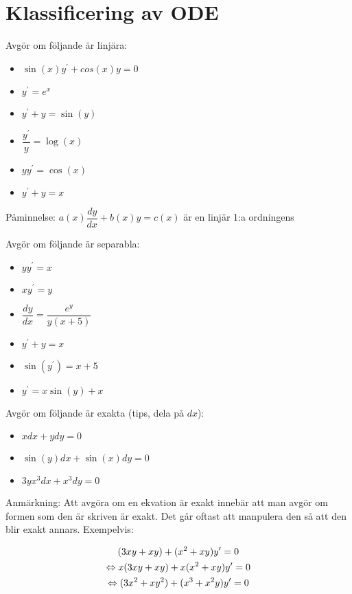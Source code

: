\section{Klassificering av ODE}

\noindent Avgör om följande är linjära:

\begin{itemize}
  \item $\sin(x)y^{\prime}+cos(x)y=0$
  \item $y^{\prime}=e^x$
  \item $y^{\prime}+y=\sin(y)$
  \item $\dfrac{y^{\prime}}{y}=\log(x)$
  \item $yy^{\prime}=\cos(x)$
  \item $y^{\prime}+y=x$
\end{itemize}

\noindent Påminnelse: $a(x)\dfrac{dy}{dx}+b(x)y=c(x)$ är en linjär 1:a ordningens
\par\bigskip

\noindent Avgör om följande är separabla:

\begin{itemize}
  \item $yy^{\prime}=x$
  \item $xy^{\prime}=y$
  \item $\dfrac{dy}{dx}=\dfrac{e^y}{y(x+5)}$
  \item $y^{\prime}+y=x$
  \item $\sin(y^{\prime})=x+5$
  \item $y^{\prime}=x\sin(y)+x$
\end{itemize}
\par\bigskip

\noindent Avgör om följande är exakta (tips, dela på $dx$):

\begin{itemize}
  \item $xdx+ydy=0$
  \item $\sin(y)dx+\sin(x)dy=0$
  \item $3yx^3dx+x^3dy=0$
\end{itemize}
\par\bigskip

\noindent Anmärkning: Att avgöra om en ekvation är exakt innebär att man avgör om formen som den är skriven är exakt. Det går oftast att manpulera den så att den blir exakt annars. Exempelvis:


\begin{equation*}
  \begin{gathered}
    (3xy+xy)+(x^2+xy)y^{\prime}=0\\
    \Leftrightarrow x(3xy+xy)+x(x^2+xy)y^{\prime}=0\\
    \Leftrightarrow (3x^2+xy^2)+(x^3+x^2y)y^{\prime}=0
  \end{gathered}
\end{equation*}
